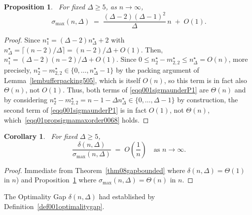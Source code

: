 \documentclass[12pt]{amsart}
\newtheorem{proposition}[theorem]{Proposition}
\newtheorem{corollary}[theorem]{Corollary}
\begin{document}
\begin{proposition}~\label{propsigmamaxorder0068}
For fixed $\Delta\geqslant 5$, as $n\to\infty$,
\begin{equation}~\label{eqq01propsigmamaxorder0068}
\sigma_{\max}(n,\Delta) \;=\; \frac{(\Delta-2)(\Delta-1)^2}{\Delta}\,n \;+\; O(1).
\end{equation}
\end{proposition}
\begin{proof}
Since $n_1^\star=(\Delta-2)n_\Delta^\star+2$ with
$n_\Delta^\star=\lceil(n-2)/\Delta\rceil = (n-2)/\Delta+O(1)$. Then, $n_1^\star = (\Delta-2)(n-2)/\Delta+O(1)$. Since $0\leqslant  n_2^\star-m_{2,2}^\star\leqslant n_\Delta^\star=O(n)$, more
precisely, $n_2^\star-m_{2,2}^\star\in\{0,\dots,n_\Delta^\star-1\}$ by the
packing argument of Lemma~\ref{lembufferpacking505}, which is itself $O(n)$, so this term is in fact also $\Theta(n)$, not $O(1)$. Thus, both terms of \eqref{eqq001sigmaunderP1} are $\Theta(n)$ and by considering $n_2^\star-m_{2,2}^\star = n-1-\Delta n_\Delta^\star \in \{0,\dots,\Delta-1\}$
by construction, the second term of \eqref{eqq001sigmaunderP1} is in fact $O(1)$, not $\Theta(n)$, which~\eqref{eqq01propsigmamaxorder0068} holds.
\end{proof}

\begin{corollary}~\label{cor05vanishingrelativegap}
For fixed $\Delta\geqslant 5$,
\begin{equation}~\label{eqq01cor05vanishingrelativegap}
\frac{\delta(n,\Delta)}{\sigma_{\max}(n,\Delta)} \;=\; O\!\left(\frac{1}{n}\right) \quad \text{as } n\to\infty.
\end{equation}
\end{corollary}
\begin{proof}
Immediate from Theorem~\ref{thm08gapbounded} where $\delta(n,\Delta)=\Theta(1)$ in $n$) and Proposition~\ref{propsigmamaxorder0068} where $\sigma_{\max}(n,\Delta)=\Theta(n)$ in $n$.
\end{proof}

The Optimality Gap $\delta(n,\Delta)$ had established by Definition~\ref{def001optimalitygap}.
\end{document}
